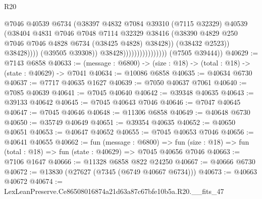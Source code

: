 \begin{lexlean}{R20}
\begin{coremodule}
{                                                @7046
                                                @40539
                                                @6734
                                                (@38397
                                                  @4832
                                                  @7084
                                                  @39310
                                                  (@7115 @32329)
                                                  @40539
                                                  (@38404
                                                    @4831
                                                    @7046
                                                    @7048
                                                    @7114
                                                    @32329
                                                    @38416
                                                    (@38390
                                                      @4829
                                                      @250
                                                      @7046
                                                      @7046
                                                      @4828
                                                      @6734
                                                      (@38425 @4828)
                                                      @38428))
                                                  (@38432 @2523))
                                                @38428))))
                                        (@39505 @39308))
                                      @38428))))))))))))))))
      (@7505 @39444))
@40629 := @7143 @6858
@40633 := (message : @6800) -> (size : @18) -> (total : @18) -> (state : @40629) -> @7041
@40634 := @10086 @6858
@40635 := @40634 @6730
@40637 := @7717 @40635 @1627
@40639 := @7050 @40637 @7061
@40640 := @7085 @40639
@40641 := @7045 @40640
@40642 := @39348 @40635
@40643 := @39133 @40642
@40645 := @7045 @40643 @7046
@40646 := @7047 @40645
@40647 := @7045 @40646
@40648 := @11306 @6858
@40649 := @40648 @6730
@40650 := @35749 @40649
@40651 := @39354 @40635
@40652 := @40650 @40651
@40653 := @40647 @40652
@40655 := @7045 @40653 @7046
@40656 := @40641 @40655
@40662 := fun (message : @6800) =>
  fun (size : @18) => fun (total : @18) => fun (state : @40629) => @7045 @40656 @7046
@40663 := @7106 @1647
@40666 := @11328 @6858 @822 @24250
@40667 := @40666 @6730
@40672 := @13830 (@27627 (@7345 (@6749 @40667 @6734)))
@40673 := @40663 @40672
@40674 := LexLeanPreserve.Ce86508016874a21d63a87c67bfe10b5a.R20.__fits_47
}
\end{coremodule}
\end{lexlean}

